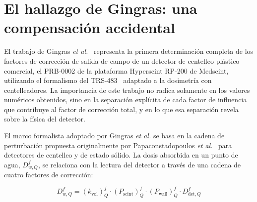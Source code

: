 \documentclass[11pt,a4paper]{article}
\begin{document}
\section{El hallazgo de Gingras: una compensación accidental}



El trabajo de Gingras \textit{et al.}~\cite{gingras2025} representa la primera determinación completa de los factores de corrección de salida de campo de un detector de centelleo plástico comercial, el PRB-0002 de la plataforma Hyperscint RP-200 de Medscint, utilizando el formalismo del TRS-483~\cite{palmans2018} adaptado a la dosimetría con centelleadores. La importancia de este trabajo no radica solamente en los valores numéricos obtenidos, sino en la separación explícita de cada factor de influencia que contribuye al factor de corrección total, y en lo que esa separación revela sobre la física del detector.

El marco formalista adoptado por Gingras \textit{et al.} se basa en la cadena de perturbación propuesta originalmente por Papaconstadopoulos \textit{et al.}~\cite{papaconstadopoulos2014} para detectores de centelleo y de estado sólido. La dosis absorbida en un punto de agua, $D^{f}_{w,Q}$, se relaciona con la lectura del detector a través de una cadena de cuatro factores de corrección:

\begin{equation}
D^{f}_{w,Q} = (k_{\mathrm{vol}})^{f}_{Q} \cdot (P_{\mathrm{scint}})^{f}_{Q} \cdot (P_{\mathrm{wall}})^{f}_{Q} \cdot D^{f}_{\mathrm{det},Q}
\label{eq:perturbation_chain}
\end{equation}
\end{document}
